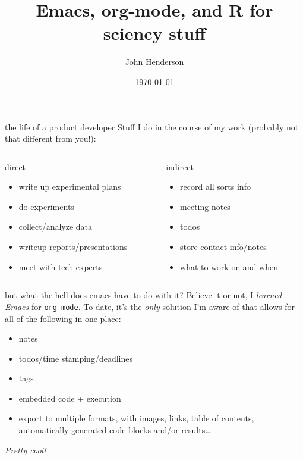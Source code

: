 \documentclass[aspectratio=169,presentation,bigger,fleqn,t]{beamer}
\author{John Henderson}
\date{\today}
\title{Emacs, org-mode, and R for sciency stuff}
\begin{document}
\maketitle



\begin{frame}[label={sec:orgheadline1}]{the life of a product developer}
Stuff I do in the course of my work (probably not that different from you!):

\begin{columns}
\begin{column}{0.5\columnwidth}
\begin{block}{direct}
\begin{itemize}
\item write up experimental plans
\item do experiments
\item collect/analyze data
\item writeup reports/presentations
\item meet with tech experts
\end{itemize}
\end{block}
\end{column}

\begin{column}{0.5\columnwidth}
\begin{block}{indirect}
\begin{itemize}
\item record all sorts info
\item meeting notes
\item todos
\item store contact info/notes
\item what to work on and when
\end{itemize}
\end{block}
\end{column}
\end{columns}
\end{frame}

\begin{frame}[fragile,label={sec:orgheadline2}]{but what the hell does emacs have to do with it?}
 Believe it or not, I \emph{learned Emacs} for \texttt{org-mode}. To date, it's the \emph{only} solution I'm
aware of that allows for all of the following in one place:
\begin{itemize}
\item notes
\item todos/time stamping/deadlines
\item tags
\item embedded code + execution
\item export to multiple formats, with images, links, table of contents, automatically
generated code blocks and/or results\ldots{}
\end{itemize}

\pause

\emph{Pretty cool!}
\end{frame}
\end{document}
